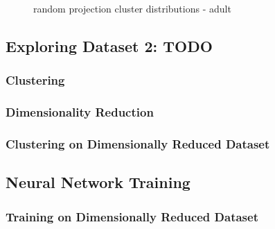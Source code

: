 \documentclass{sig-alternate}
\begin{document}
\begin{figure}[!htbp]
    \centering
    \theverbbox
    \caption{random projection cluster distributions - adult\label{rp-custer-dist-adult}}
\end{figure}





\subsection{Exploring Dataset 2: TODO}

\subsubsection{Clustering}


\subsubsection{Dimensionality Reduction}


\subsubsection{Clustering on Dimensionally Reduced Dataset}



\subsection{Neural Network Training}


\subsubsection{Training on Dimensionally Reduced Dataset}
\end{document}
